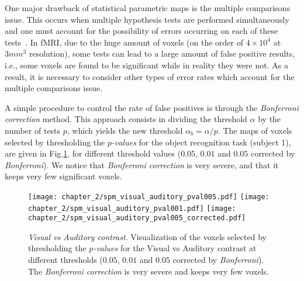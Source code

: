 One major drawback of statistical parametric maps is the multiple comparisons issue. This occurs when multiple hypothesis tests are performed simultaneously and one must account for the possibility of errors occurring on each of these tests~\citep{toothaker1993multiple, miller1966simultaneous, westfall1993resampling}. In fMRI, due to the huge amount of voxels (on the order of $4 \times 10^4$ at $3mm^3$ resolution), some tests can lead to a large amount of false positive results, i.e., some voxels are found to be significant while in reality they were not. As a result, it is necessary to consider other types of error rates which account for the multiple comparisons issue. 

A simple procedure to control the rate of false positives is through the \emph{Bonferroni correction} method. This approach consists in dividing the threshold $\alpha$ by the number
of tests $p$, which yields the new threshold $\alpha_b = \alpha / p$.
The maps of voxels selected by thresholding the \emph{$p$-values} for the object
recognition task (subject 1), are given in Fig.\ref{fig:chapter_2_comparisons},
for different threshold values ($0.05$, $0.01$ and $0.05$ corrected by
\emph{Bonferroni}).
We notice that \emph{Bonferroni correction} is very severe, and that
it keeps very few significant voxels. 

\begin{figure}
\begin{center}
\texttt{[image: chapter\_2/spm\_visual\_auditory\_pval005.pdf]}
\texttt{[image: chapter\_2/spm\_visual\_auditory\_pval001.pdf]}
\texttt{[image: chapter\_2/spm\_visual\_auditory\_pval005\_corrected.pdf]}
\end{center}
\caption{\emph{Visual vs Auditory contrast}. Visualization of the voxels selected by
thresholding the
\emph{$p$-values} for the Visual vs Auditory contrast at different thresholds
($0.05$, $0.01$ and $0.05$ corrected by \emph{Bonferroni}). The \emph{Bonferroni
correction} is very severe and keeps very few voxels.
}\label{fig:chapter_2_comparisons}
\end{figure}


